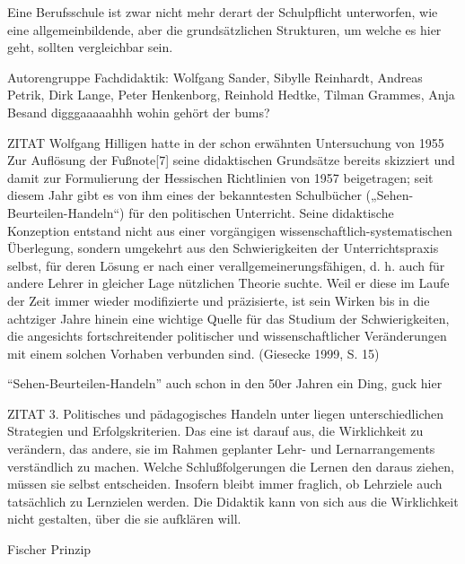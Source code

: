 Eine Berufsschule ist zwar nicht mehr derart der Schulpflicht unterworfen, wie eine allgemeinbildende, aber die grundsätzlichen Strukturen, um welche es hier geht, sollten vergleichbar sein.

 \textcite[467-469]{Nonnenmacher2010}

Autorengruppe Fachdidaktik:
Wolfgang Sander, Sibylle Reinhardt, Andreas Petrik, Dirk Lange, Peter Henkenborg, Reinhold Hedtke, Tilman Grammes, Anja Besand
\autocite[]{Sander.2016}
digggaaaaahhh wohin gehört der bums?\autocite[]{Sander.2016}

ZITAT
 Wolfgang Hilligen hatte in der schon erwähnten Untersuchung von 1955 Zur Auflösung der Fußnote[7] seine didaktischen Grundsätze bereits skizziert und damit zur Formulierung der Hessischen Richtlinien von 1957 beigetragen; seit diesem Jahr gibt es von ihm eines der bekanntesten Schulbücher („Sehen-Beurteilen-Handeln“) für den politischen Unterricht. Seine didaktische Konzeption entstand nicht aus einer vorgängigen wissenschaftlich-systematischen Überlegung, sondern umgekehrt aus den Schwierigkeiten der Unterrichtspraxis selbst, für deren Lösung er nach einer verallgemeinerungsfähigen, d. h. auch für andere Lehrer in gleicher Lage nützlichen Theorie suchte. Weil er diese im Laufe der Zeit immer wieder modifizierte und präzisierte, ist sein Wirken bis in die achtziger Jahre hinein eine wichtige Quelle für das Studium der Schwierigkeiten, die angesichts fortschreitender politischer und wissenschaftlicher Veränderungen mit einem solchen Vorhaben verbunden sind.  (Giesecke 1999, S. 15)

\enquote{Sehen-Beurteilen-Handeln} auch schon in den 50er Jahren ein Ding, guck hier \autocite[15]{Giesecke.1999}

ZITAT
 3. Politisches und pädagogisches Handeln unter liegen unterschiedlichen Strategien und Erfolgskriterien. Das eine ist darauf aus, die Wirklichkeit zu verändern, das andere, sie im Rahmen geplanter Lehr- und Lernarrangements verständlich zu machen. Welche Schlußfolgerungen die Lernen den daraus ziehen, müssen sie selbst entscheiden. Insofern bleibt immer fraglich, ob Lehrziele auch tatsächlich zu Lernzielen werden. Die Didaktik kann von sich aus die Wirklichkeit nicht gestalten, über die sie aufklären will. \autocite[22]{Giesecke.1999}


Fischer Prinzip \autocite[]{Grammes.2005}

